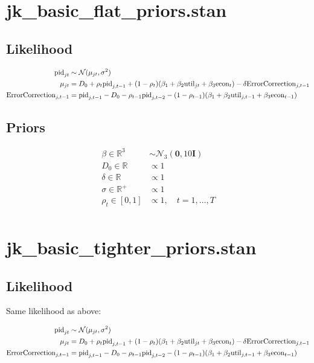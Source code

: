 \documentclass[11pt, oneside]{article}
\newcommand{\mc}[1]{\mathcal{#1}}
\begin{document}
\pagestyle{empty}


\section*{jk\_basic\_flat\_priors.stan}
\subsection*{Likelihood} 

\begin{align*}
{\rm pid}_{jt} &
	\sim \mc{N}(\mu_{jt}, \sigma^2)  \\
%	
\mu_{jt} &= 
	D_0 + \rho_t {\rm pid}_{j, t-1} + 
	(1-\rho_t)(\beta_1 + \beta_2 {\rm util}_{jt} + \beta_3 {\rm econ}_t) - 
	\delta {\rm ErrorCorrection}_{j,t-1} \\
%	
 {\rm ErrorCorrection}_{j,t-1} &= 
 	{\rm pid}_{j, t-1} - D_0 - \rho_{t-1} {\rm pid}_{j, t-2} - 
	(1 - \rho_{t-1}) (\beta_1 + \beta_2 {\rm util}_{j,t-1} + \beta_3 {\rm econ}_{t-1}) 
%	
\end{align*}


\subsection*{Priors} 
\begin{align*}
	\beta \in \mathbb{R}^3 &\sim \mc{N}_3(\mathbf{0}, 10\mathbf{I}) \\
	D_0 \in \mathbb{R} &\propto 1 \\
	\delta \in \mathbb{R} &\propto 1 \\
	\sigma \in \mathbb{R}^+ &\propto 1 \\
	\rho_t \in [0,1] &\propto 1, \quad t = 1, \dots, T \\
\end{align*}




\section*{jk\_basic\_tighter\_priors.stan}
\subsection*{Likelihood} 

Same likelihood as above:

\begin{align*}
{\rm pid}_{jt} &
	\sim \mc{N}(\mu_{jt}, \sigma^2)  \\
%	
\mu_{jt} &= 
	D_0 + \rho_t {\rm pid}_{j, t-1} + 
	(1-\rho_t)(\beta_1 + \beta_2 {\rm util}_{jt} + \beta_3 {\rm econ}_t) - 
	\delta {\rm ErrorCorrection}_{j,t-1} \\
%	
 {\rm ErrorCorrection}_{j,t-1} &= 
 	{\rm pid}_{j, t-1} - D_0 - \rho_{t-1} {\rm pid}_{j, t-2} - 
	(1 - \rho_{t-1}) (\beta_1 + \beta_2 {\rm util}_{j,t-1} + \beta_3 {\rm econ}_{t-1}) 
%	
\end{align*}
\end{document}
